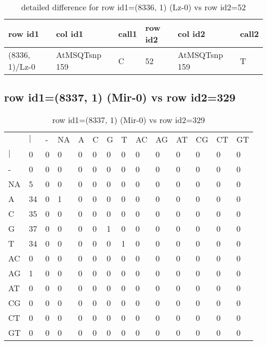 \begin{center}
\begin{longtable}{|l|l|l|l|l|l|}
\caption{detailed difference for row id1=(8336, 1) (Lz-0) vs row id2=52} \label{table_dm339}\\
\hline
row id1&col id1&call1&row id2&col id2&call2\\
\hline
(8336, 1)/Lz-0&AtMSQTsnp 159&C&52&AtMSQTsnp 159&T\\
\hline
\end{longtable}
\end{center}

\subsection{row id1=(8337, 1) (Mir-0) vs row id2=329}
\begin{center}
\begin{longtable}{|l|l|l|l|l|l|l|l|l|l|l|l|l|l|}
\caption{row id1=(8337, 1) (Mir-0) vs row id2=329} \label{table_dm340}\\
\hline
\\
\hline
&$|$&-&NA&A&C&G&T&AC&AG&AT&CG&CT&GT\\
$|$&0&0&0&0&0&0&0&0&0&0&0&0&0\\
-&0&0&0&0&0&0&0&0&0&0&0&0&0\\
NA&5&0&0&0&0&0&0&0&0&0&0&0&0\\
A&34&0&1&0&0&0&0&0&0&0&0&0&0\\
C&35&0&0&0&0&0&0&0&0&0&0&0&0\\
G&37&0&0&0&0&1&0&0&0&0&0&0&0\\
T&34&0&0&0&0&0&1&0&0&0&0&0&0\\
AC&0&0&0&0&0&0&0&0&0&0&0&0&0\\
AG&1&0&0&0&0&0&0&0&0&0&0&0&0\\
AT&0&0&0&0&0&0&0&0&0&0&0&0&0\\
CG&0&0&0&0&0&0&0&0&0&0&0&0&0\\
CT&0&0&0&0&0&0&0&0&0&0&0&0&0\\
GT&0&0&0&0&0&0&0&0&0&0&0&0&0\\
\hline
\end{longtable}
\end{center}

